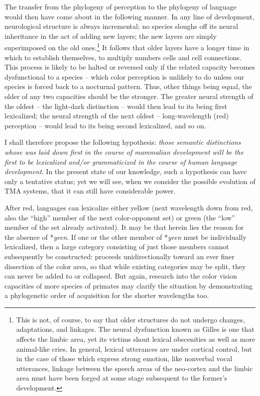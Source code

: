 The transfer from the phylogeny of perception to the phylogeny of language would then have come about in the following manner. In any line of development, neurological structure is always incremental; no species sloughs off its neural inheritance in the act of adding new layers; the new layers are simply superimposed on the old ones.\footnote{This is not, of course, to say that older structures do not undergo changes, adaptations, and linkages. The neural dysfunction known as Gilles  is one that affects the limbic area, yet its victims shout lexical obscenities as well as more animal-like cries. In general, lexical utterances are under cortical control, but in the case of those which express strong emotion, like nonverbal vocal utterances, linkage between the speech areas of the neo-cortex and the limbic area must have been forged at some stage subsequent to the former's development.} It follows that older layers have a longer time in which to establish themselves, to multiply numbers cells and cell connections. This process is likely to be halted or reversed only if the related capacity becomes dysfunctional to a species -- which color perception is unlikely to do unless our species is forced back to a nocturnal pattern. Thus, other things being equal, the older of any two capacities should be the stronger. The greater neural strength of the oldest -- the light-dark distinction -- would then lead to its being first lexicalized; the neural strength of the next oldest -- long-wavelength (red) perception -- would lead to its being second lexicalized, and so on.

I shall therefore propose the following hypothesis: \textit{those semantic distinctions whose  was laid down first in the course of mammalian development will be the first to be lexicalized and/or grammaticized in the course of human language development}. In the present state of our knowledge, such a hypothesis can have only a tentative status; yet we will see, when we consider the possible evolution of TMA systems, that it can still have considerable power.

After red, languages can lexicalize either yellow (next wavelength down from red, also the ``high'' member of the next color-opponent set) or green (the ``low'' member of the set already activated). It may be that herein lies the reason for the absence of *\textit{yeen}. If one or the other member of *\textit{yeen} must be individually lexicalized, then a large category consisting of just those members cannot subsequently be constructed:  proceeds unidirectionally toward an ever finer dissection of the color area, so that while existing categories
may be split, they can never be added to or collapsed. But again, research into the color vision capacities of more species of primates may clarify the situation by demonstrating a phylogenetic order of acquisition for the shorter wavelengths too.

